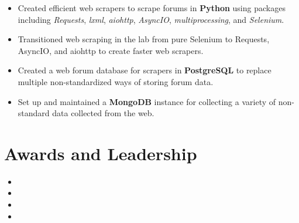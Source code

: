 \documentclass[10pt]{setzer_resume}
\begin{document}
  \begin{itemize}[nosep]%

    \item Created efficient web scrapers to scrape forums in \textbf{Python} using packages including \textit{Requests}, \textit{lxml}, \textit{aiohttp}, \textit{AsyncIO}, \textit{multiprocessing}, and \textit{Selenium}.
    \item Transitioned web scraping in the lab from pure Selenium to Requests, AsyncIO, and aiohttp to create faster web scrapers.
    \item Created a web forum database for scrapers in \textbf{PostgreSQL} to replace multiple non-standardized ways of storing forum data.
    \item Set up and maintained a \textbf{MongoDB} instance for collecting a variety of non-standard data collected from the web.
          
  \end{itemize}






  \section{Awards and Leadership}

  \begin{itemize}
    \item {}
    \item {}
    \item {} %
    \item {}
  \end{itemize}

\end{document}
